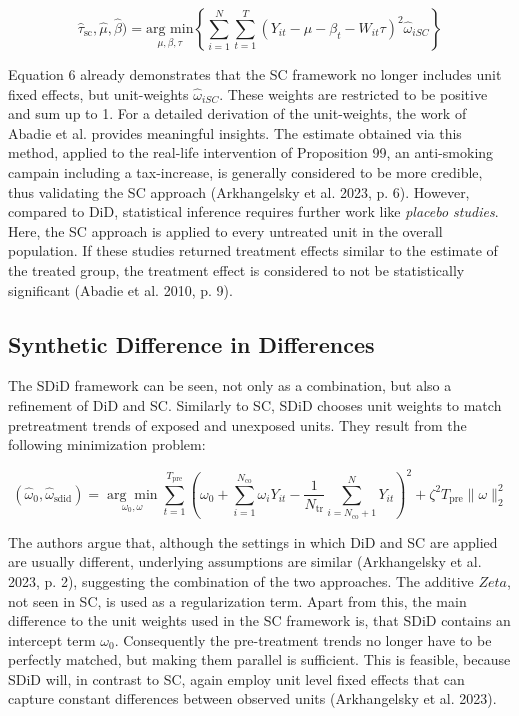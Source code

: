 \documentclass[8pt]{article}
\begin{document}
\begin{equation}
\hat{\tau}_{\text{sc}}, \hat{\mu}, \hat{\beta}) = \underset{\mu, \beta, \tau}{\text{arg min}} \left\{ \sum_{i=1}^{N} \sum_{t=1}^{T} \left( Y_{it} - \mu - \beta_t - W_{it} \tau \right)^2 \hat{\omega}_{iSC} \right\}
\end{equation}
 
Equation 6 already demonstrates that the SC framework no longer includes unit fixed effects, but unit-weights $\hat{\omega}_{iSC}$. These weights are restricted to be positive and sum up to 1. For a detailed derivation of the unit-weights, the work of Abadie et al. provides meaningful insights.
The estimate obtained via this method, applied to the real-life intervention of Proposition 99, an anti-smoking campain including a tax-increase, is generally considered to be more credible, thus validating the SC approach (Arkhangelsky et al. 2023, p. 6).
However, compared to DiD, statistical inference requires further work like \textit{placebo studies}. Here, the SC approach is applied to every untreated unit in the overall population. If these studies returned treatment effects similar to the estimate of the treated group, the treatment effect is considered to not be statistically significant (Abadie et al. 2010, p. 9). 

\subsection{Synthetic Difference in Differences}
The SDiD framework can be seen, not only as a combination, but also a refinement of DiD and SC. Similarly to SC, SDiD chooses unit weights to match pretreatment trends of exposed and unexposed units. They result from the following minimization problem:

\begin{equation}
(\hat{\omega}_0, \hat{\omega}_{\text{sdid}}) = \underset{\omega_0, \omega}{\arg\min}
 \sum_{t=1}^{T_{\text{pre}}} \left( \omega_0 + \sum_{i=1}^{N_{\text{co}}} \omega_i Y_{it} - \frac{1}{N_{\text{tr}}} \sum_{i=N_{\text{co}}+1}^{N} Y_{it} \right)^2 + \zeta^2 T_{\text{pre}} \| \omega \|^2_2
\end{equation}

The authors argue that, although the settings in which DiD and SC are applied are usually different, underlying assumptions are similar (Arkhangelsky et al. 2023, p. 2), suggesting the combination of the two approaches.
The additive $Zeta$, not seen in SC, is used as a regularization term. Apart from this, the main difference to the unit weights used in the SC framework is, that SDiD contains an intercept term $\omega_0$. Consequently the pre-treatment trends no longer have to be perfectly matched, but making them parallel is sufficient. This is feasible, because SDiD will, in contrast to SC, again employ unit level fixed effects that can capture constant differences between observed units (Arkhangelsky et al. 2023). 
\end{document}
